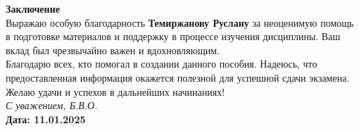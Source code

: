 \documentclass[a4paper,12pt]{article}
\begin{document}
\thispagestyle{empty}
\begin{center}
    \vfill
    \textbf{\Large Заключение} \\
    \vspace{2em}
    Выражаю особую благодарность \textbf{Темиржанову Руслану} за неоценимую помощь в подготовке материалов и поддержку в процессе изучения дисциплины. Ваш вклад был чрезвычайно важен и вдохновляющим. \\
    \vspace{2em}
    Благодарю всех, кто помогал в создании данного пособия. Надеюсь, что предоставленная информация окажется полезной для успешной сдачи экзамена. \\
    \vspace{2em}
    Желаю удачи и успехов в дальнейших начинаниях! \\
    \vfill
    \textit{С уважением, Б.В.О.} \\
    \vspace{2em}
    \textbf{Дата: 11.01.2025}
    \vspace{3em}
\end{center}
\end{document}
